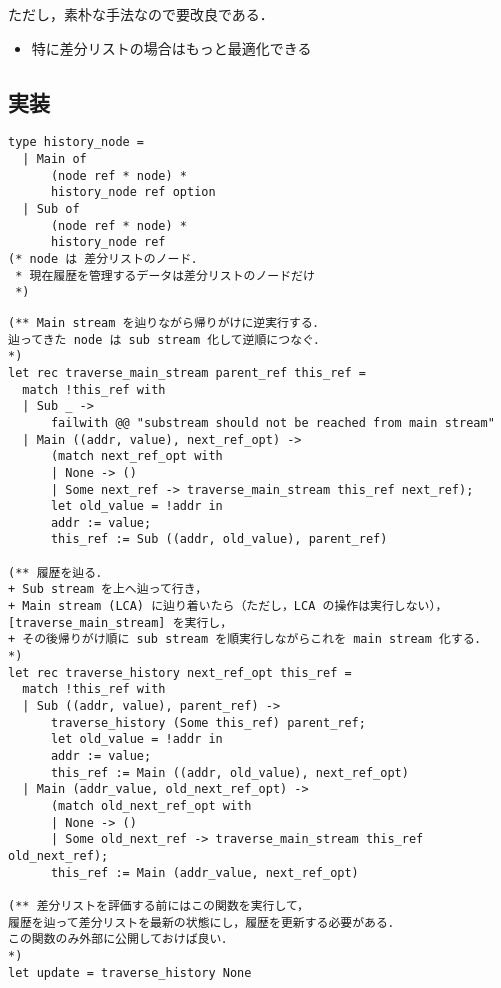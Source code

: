 \documentclass[10pt, a4j, twocolumn]{scrartcl}
\begin{document}
ただし，素朴な手法なので要改良である．
\begin{itemize}
\item 特に差分リストの場合はもっと最適化できる
\end{itemize}


\subsection{実装}
\label{sec:org41932ba}

\begin{lstlisting}
type history_node =
  | Main of
      (node ref * node) *
      history_node ref option
  | Sub of
      (node ref * node) *
      history_node ref
(* node は 差分リストのノード．
 * 現在履歴を管理するデータは差分リストのノードだけ
 *)
\end{lstlisting}


\begin{lstlisting}
(** Main stream を辿りながら帰りがけに逆実行する．
辿ってきた node は sub stream 化して逆順につなぐ．
*)
let rec traverse_main_stream parent_ref this_ref =
  match !this_ref with
  | Sub _ -> 
      failwith @@ "substream should not be reached from main stream"
  | Main ((addr, value), next_ref_opt) ->
      (match next_ref_opt with
      | None -> ()
      | Some next_ref -> traverse_main_stream this_ref next_ref);
      let old_value = !addr in
      addr := value;
      this_ref := Sub ((addr, old_value), parent_ref)

(** 履歴を辿る．
+ Sub stream を上へ辿って行き，
+ Main stream (LCA) に辿り着いたら（ただし，LCA の操作は実行しない），[traverse_main_stream] を実行し，
+ その後帰りがけ順に sub stream を順実行しながらこれを main stream 化する．
*)
let rec traverse_history next_ref_opt this_ref =
  match !this_ref with
  | Sub ((addr, value), parent_ref) ->
      traverse_history (Some this_ref) parent_ref;
      let old_value = !addr in
      addr := value;
      this_ref := Main ((addr, old_value), next_ref_opt)
  | Main (addr_value, old_next_ref_opt) ->
      (match old_next_ref_opt with
      | None -> ()
      | Some old_next_ref -> traverse_main_stream this_ref old_next_ref);
      this_ref := Main (addr_value, next_ref_opt)

(** 差分リストを評価する前にはこの関数を実行して，
履歴を辿って差分リストを最新の状態にし，履歴を更新する必要がある．
この関数のみ外部に公開しておけば良い．
*)
let update = traverse_history None
\end{lstlisting}
\end{document}

